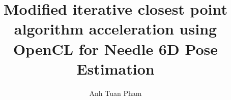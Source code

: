 \documentclass[11pt,a4paper,footexclude,headsepline,footsepline,BCOR12mm,DIV13]{scrbook}
\author{Anh Tuan Pham}
\title{Modified iterative closest point algorithm acceleration using OpenCL for Needle 6D Pose Estimation}
\begin{document}

\cleardoublepage




\tableofcontents{}




\newpage


\end{document}
